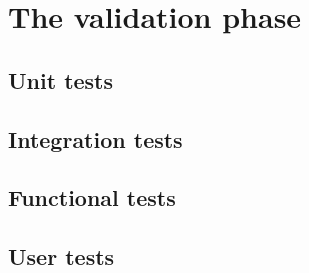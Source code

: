 \documentclass{report}
\begin{document}
\chapter{The validation phase}

\section{Unit tests}

\section{Integration tests}

\section{Functional tests}

\section{User tests}


\appendix
\end{document}
